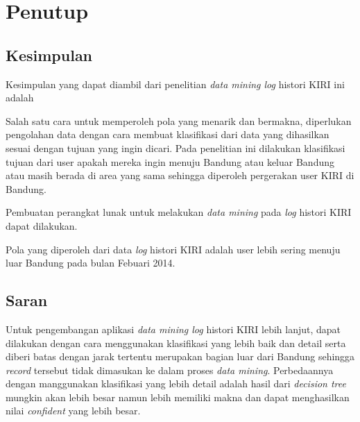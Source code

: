 \chapter{Penutup}

\section{Kesimpulan}

Kesimpulan yang dapat diambil dari penelitian \textsl{data mining log} histori KIRI ini adalah 

Salah satu cara untuk memperoleh pola yang menarik dan bermakna, diperlukan pengolahan data dengan cara membuat klasifikasi dari data yang dihasilkan sesuai dengan tujuan yang ingin dicari. Pada penelitian ini dilakukan klasifikasi tujuan dari user apakah mereka ingin menuju Bandung atau keluar Bandung atau masih berada di area yang sama sehingga diperoleh pergerakan user KIRI di Bandung.

Pembuatan perangkat lunak untuk melakukan \textsl{data mining} pada \textsl{log} histori KIRI dapat dilakukan.

Pola yang diperoleh dari data \textsl{log} histori KIRI adalah user lebih sering menuju luar Bandung pada bulan Febuari 2014.

\section{Saran}

Untuk pengembangan aplikasi \textsl{data mining log} histori KIRI lebih lanjut, dapat dilakukan dengan cara menggunakan klasifikasi yang lebih baik dan detail serta diberi batas dengan jarak tertentu merupakan bagian luar dari Bandung sehingga \textsl{record} tersebut tidak dimasukan ke dalam proses \textsl{data mining}. Perbedaannya dengan manggunakan klasifikasi yang lebih detail adalah hasil dari \textsl{decision tree} mungkin akan lebih besar namun lebih memiliki makna dan dapat menghasilkan nilai \textsl{confident} yang lebih besar.
